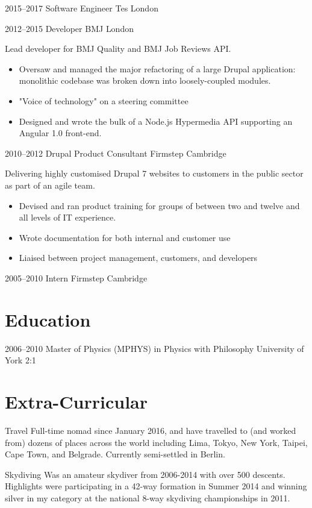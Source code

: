 \documentclass[10pt,a4paper,sans]{moderncv}
\begin{document}
\cventry
  {2015--2017}
  {Software Engineer}
  {Tes}
  {London}
  {}
  {}

\cventry
  {2012--2015}
  {Developer}
  {BMJ}
  {London}
  {}
  {
    Lead developer for BMJ Quality and BMJ Job Reviews API.
    \begin{itemize}
      \item Oversaw and managed the major refactoring of a large Drupal application: monolithic codebase was broken down into loosely-coupled modules.
      \item "Voice of technology" on a steering committee
      \item Designed and wrote the bulk of a Node.js Hypermedia API supporting an Angular 1.0 front-end.
    \end{itemize}
  }

\cventry
  {2010--2012}
  {Drupal Product Consultant}
  {Firmstep}
  {Cambridge}
  {}
  {
    Delivering highly customised Drupal 7 websites to customers in the public sector as part of an agile team.
    \begin{itemize}
      \item Devised and ran product training for groups of between two and twelve and all levels of IT experience.
      \item Wrote documentation for both internal and customer use
      \item Liaised between project management, customers, and developers
    \end{itemize}
  }

\cventry
  {2005--2010}
  {Intern}
  {Firmstep}
  {Cambridge}
  {}
  {}

\section{Education}

\cventry
  {2006--2010}
  {Master of Physics (\small{MPHYS}) in Physics with Philosophy}
  {\newline{}University of York}
  {}
  {2:1}
  {}

\section{Extra-Curricular}

\cvitem
  {Travel}
  {
    Full-time nomad since January 2016, and have travelled to (and worked from) dozens of places across the world including Lima, Tokyo, New York, Taipei, Cape Town, and Belgrade. Currently semi-settled in Berlin.
  }

\cvitem
  {Skydiving}
  {
    Was an amateur skydiver from 2006-2014 with over 500 descents. Highlights were participating in a 42-way formation in Summer 2014 and winning silver in my category at the national 8-way skydiving championships in 2011.
  }
\end{document}
